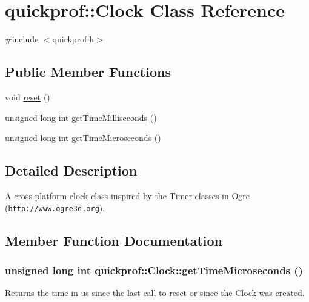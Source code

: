 \hypertarget{classquickprof_1_1_clock}{
\section{quickprof::Clock Class Reference}
\label{classquickprof_1_1_clock}
}


{\ttfamily \#include $<$quickprof.h$>$}\subsection*{Public Member Functions}
\begin{DoxyCompactItemize}
\item 
void \hyperlink{classquickprof_1_1_clock_a22b4d38f4562efd7f624a70efdb1add4}{reset} ()
\item 
unsigned long int \hyperlink{classquickprof_1_1_clock_a0b751b8c42d2c86e82b3199b6039794a}{getTimeMilliseconds} ()
\item 
unsigned long int \hyperlink{classquickprof_1_1_clock_aa39085e044671d67653d5e1b444c5642}{getTimeMicroseconds} ()
\end{DoxyCompactItemize}


\subsection{Detailed Description}
A cross-\/platform clock class inspired by the Timer classes in Ogre (\href{http://www.ogre3d.org}{\tt http://www.ogre3d.org}). 

\subsection{Member Function Documentation}
\hypertarget{classquickprof_1_1_clock_aa39085e044671d67653d5e1b444c5642}{
\subsubsection[{getTimeMicroseconds}]{\setlength{\rightskip}{0pt plus 5cm}unsigned long int quickprof::Clock::getTimeMicroseconds ()}}
\label{classquickprof_1_1_clock_aa39085e044671d67653d5e1b444c5642}
Returns the time in us since the last call to reset or since the \hyperlink{classquickprof_1_1_clock}{Clock} was created.

